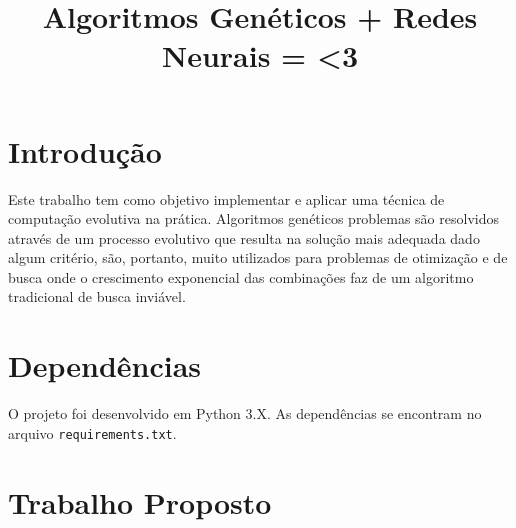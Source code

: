 \documentclass[twoside,conference,a4paper]{IEEEtran}
\begin{document}
\renewcommand{\IEEEkeywordsname}{Palavras-chave}


\title{Algoritmos Genéticos + Redes Neurais = <3}
\author{%
}


\maketitle


\section{Introdução}

Este trabalho tem como objetivo implementar e aplicar uma técnica de computação evolutiva na prática.
Algoritmos genéticos problemas são resolvidos através de um processo evolutivo que resulta na solução mais adequada dado algum critério, são, portanto, muito utilizados para problemas de otimização e de busca onde o crescimento exponencial das combinações faz de um algoritmo tradicional de busca inviável.

\section{Dependências}

O projeto foi desenvolvido em Python 3.X. As dependências se encontram no arquivo \texttt{requirements.txt}.

\section{Trabalho Proposto}
\end{document}

